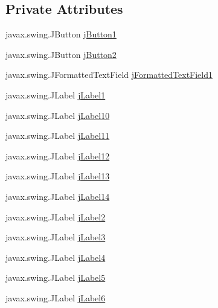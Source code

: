 \subsection*{Private Attributes}
\begin{DoxyCompactItemize}
\item 
javax.\+swing.\+J\+Button \mbox{\hyperlink{classsoftware_1_1parasoftware3_a64399e1ff0c22252784a8fb418269e32}{j\+Button1}}
\item 
javax.\+swing.\+J\+Button \mbox{\hyperlink{classsoftware_1_1parasoftware3_aa69f792b77392d92a3821f9d35b0cf27}{j\+Button2}}
\item 
javax.\+swing.\+J\+Formatted\+Text\+Field \mbox{\hyperlink{classsoftware_1_1parasoftware3_a4e49828df449aa92bc2e485f901dc7ae}{j\+Formatted\+Text\+Field1}}
\item 
javax.\+swing.\+J\+Label \mbox{\hyperlink{classsoftware_1_1parasoftware3_ae1871baf2f1bc751040bce3b2dc970c1}{j\+Label1}}
\item 
javax.\+swing.\+J\+Label \mbox{\hyperlink{classsoftware_1_1parasoftware3_ac2e16b2c38aefb461c2f0eced858c1fd}{j\+Label10}}
\item 
javax.\+swing.\+J\+Label \mbox{\hyperlink{classsoftware_1_1parasoftware3_ab18f2dadd065ca433f08c878d3ff2b49}{j\+Label11}}
\item 
javax.\+swing.\+J\+Label \mbox{\hyperlink{classsoftware_1_1parasoftware3_abbd12b5ff66390642a8541054290bc50}{j\+Label12}}
\item 
javax.\+swing.\+J\+Label \mbox{\hyperlink{classsoftware_1_1parasoftware3_a7b6fbb00c7d61828f62e29c35188d960}{j\+Label13}}
\item 
javax.\+swing.\+J\+Label \mbox{\hyperlink{classsoftware_1_1parasoftware3_a8cf21f19b1d00a92b53875d6c27aed2f}{j\+Label14}}
\item 
javax.\+swing.\+J\+Label \mbox{\hyperlink{classsoftware_1_1parasoftware3_ada0c2e8fce30c1215e2a30042d386f00}{j\+Label2}}
\item 
javax.\+swing.\+J\+Label \mbox{\hyperlink{classsoftware_1_1parasoftware3_a62ceb2511ec08ce64863778ec683c2ef}{j\+Label3}}
\item 
javax.\+swing.\+J\+Label \mbox{\hyperlink{classsoftware_1_1parasoftware3_ae4d1716581a61676309b2c118472da31}{j\+Label4}}
\item 
javax.\+swing.\+J\+Label \mbox{\hyperlink{classsoftware_1_1parasoftware3_ab53c1071f13a8fa9a2c371c4b9892253}{j\+Label5}}
\item 
javax.\+swing.\+J\+Label \mbox{\hyperlink{classsoftware_1_1parasoftware3_a4afbf232c47d3ab6c0aaf0ae394219bf}{j\+Label6}}

\end{DoxyCompactItemize}
